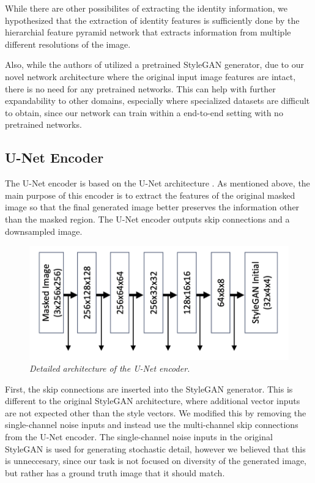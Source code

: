 \documentclass[sigconf,authorversion,nonacm]{acmart}
\begin{document}
While there are other possibilites of extracting the identity information, we hypothesized
that the extraction of identity features is sufficiently done by the 
hierarchial feature pyramid network that extracts information from multiple different resolutions
of the image.

Also, while the authors of \cite{PSP} utilized a pretrained StyleGAN generator, due to our
novel network architecture where the original input image features are intact, there is no
need for any pretrained networks. This can help with further expandability to other domains,
especially where specialized datasets are difficult to obtain, since our network can train 
within a end-to-end setting with no pretrained networks.

\subsection{U-Net Encoder}
The U-Net encoder is based on the U-Net architecture \cite{UNet}. As mentioned above, the main
purpose of this encoder is to extract the features of the original masked image so that the final
generated image better preserves the information other than the masked region. The U-Net encoder
outputs skip connections and a downsampled image.

\begin{figure}[H]
  \centering
  \includegraphics[width=0.8\linewidth]{images/unet.png}
  \caption{\emph{Detailed architecture of the U-Net encoder.}}
\end{figure}

First, the skip connections are inserted into the StyleGAN generator. This is different to the
original StyleGAN architecture, where additional vector inputs are not expected other than the
style vectors. We modified this by removing the single-channel noise inputs and instead use the multi-channel skip connections from the U-Net encoder.
The single-channel noise inputs in the original StyleGAN is used for generating stochastic detail, however we believed that this is unneccesary, since our task is not focused on diversity of the generated image, but rather has a ground truth image that it should match. 
\end{document}
